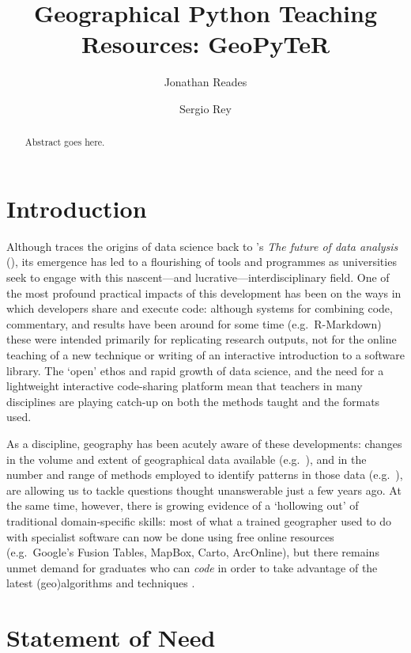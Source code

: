 \documentclass[letter, 11pt]{article}
\title{Geographical Python Teaching Resources: GeoPyTeR}
\author{Jonathan Reades \and Sergio Rey}
\newcommand{\eg}{e.g.~\/}
\begin{document}
\maketitle

\begin{abstract}
  Abstract goes here.
\end{abstract}


\section{Introduction}\label{introduction}

Although \citet{Donoho2017} traces the origins of data science back to \citeauthor{Tukey1962}'s \textit{The future of data analysis} (\citeyear{Tukey1962}), its emergence has led to a flourishing of tools and programmes as universities seek to engage with this nascent---and lucrative---interdisciplinary field. One of the most profound practical impacts of this development has been on the ways in which developers share and execute code: although systems for combining code, commentary, and results have been around for some time (\eg R-Markdown) these were intended primarily for replicating research outputs, not for the online teaching of a new technique or writing of an interactive introduction to a software library. The `open' ethos and rapid growth of data science, and the need for a lightweight interactive code-sharing platform mean that teachers in many disciplines are playing catch-up on both the methods taught and the formats used.

As a discipline, geography has been acutely aware of these developments: changes in the volume and extent of geographical data available (\eg \citealp{Graham2013,gonzalez2013big,reades2016}), and in the number and range of methods employed to identify patterns in those data (\eg \citealp{Fan2016,Naik2017,Santibanez2015,Stevens2015,ArribasBel2017}), are allowing us to tackle questions thought unanswerable just a few years ago. At the same time, however, there is growing evidence of a `hollowing out' of traditional domain-specific skills: most of what a trained geographer used to do with specialist software can now be done using free online resources (\eg Google's Fusion Tables, MapBox, Carto, ArcOnline), but there remains unmet demand for graduates who can \textit{code} in order to take advantage of the latest (geo)algorithms and techniques \citep{Singleton2014,Singleton2016}.

\section{Statement of Need}
\end{document}
